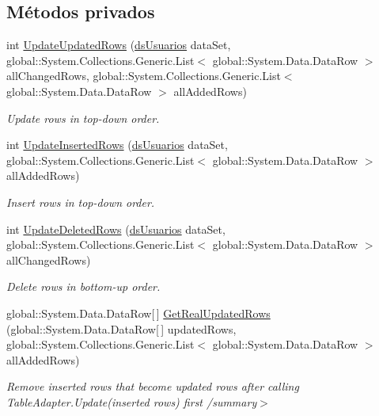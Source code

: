 \subsection*{Métodos privados}
\begin{DoxyCompactItemize}
\item 
int \hyperlink{class_proyecto___integrador__3_1_1ds_usuarios_table_adapters_1_1_table_adapter_manager_aa003ee514ac1b5226bb95a04c7889bfd}{Update\-Updated\-Rows} (\hyperlink{class_proyecto___integrador__3_1_1ds_usuarios}{ds\-Usuarios} data\-Set, global\-::\-System.\-Collections.\-Generic.\-List$<$ global\-::\-System.\-Data.\-Data\-Row $>$ all\-Changed\-Rows, global\-::\-System.\-Collections.\-Generic.\-List$<$ global\-::\-System.\-Data.\-Data\-Row $>$ all\-Added\-Rows)
\begin{DoxyCompactList}\small\item\em Update rows in top-\/down order. \end{DoxyCompactList}\item 
int \hyperlink{class_proyecto___integrador__3_1_1ds_usuarios_table_adapters_1_1_table_adapter_manager_aac4ab48768593e57aa4585e7f9e563fd}{Update\-Inserted\-Rows} (\hyperlink{class_proyecto___integrador__3_1_1ds_usuarios}{ds\-Usuarios} data\-Set, global\-::\-System.\-Collections.\-Generic.\-List$<$ global\-::\-System.\-Data.\-Data\-Row $>$ all\-Added\-Rows)
\begin{DoxyCompactList}\small\item\em Insert rows in top-\/down order. \end{DoxyCompactList}\item 
int \hyperlink{class_proyecto___integrador__3_1_1ds_usuarios_table_adapters_1_1_table_adapter_manager_ae933d35755403c4abbe8e89426018f46}{Update\-Deleted\-Rows} (\hyperlink{class_proyecto___integrador__3_1_1ds_usuarios}{ds\-Usuarios} data\-Set, global\-::\-System.\-Collections.\-Generic.\-List$<$ global\-::\-System.\-Data.\-Data\-Row $>$ all\-Changed\-Rows)
\begin{DoxyCompactList}\small\item\em Delete rows in bottom-\/up order. \end{DoxyCompactList}\item 
global\-::\-System.\-Data.\-Data\-Row\mbox{[}$\,$\mbox{]} \hyperlink{class_proyecto___integrador__3_1_1ds_usuarios_table_adapters_1_1_table_adapter_manager_afcbbeb62403513bb73fa006bf4a61f08}{Get\-Real\-Updated\-Rows} (global\-::\-System.\-Data.\-Data\-Row\mbox{[}$\,$\mbox{]} updated\-Rows, global\-::\-System.\-Collections.\-Generic.\-List$<$ global\-::\-System.\-Data.\-Data\-Row $>$ all\-Added\-Rows)
\begin{DoxyCompactList}\small\item\em Remove inserted rows that become updated rows after calling Table\-Adapter.\-Update(inserted rows) first /summary$>$ \end{DoxyCompactList}\end{DoxyCompactItemize}
